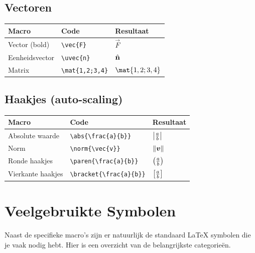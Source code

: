 \documentclass[a4paper,11pt]{article}
\begin{document}
\subsection{Vectoren}

\begin{tabular}{lll}
\toprule
\textbf{Macro} & \textbf{Code} & \textbf{Resultaat} \\
\midrule
Vector (bold) & \verb|\vec{F}| & $\vec{F}$ \\
Eenheidsvector & \verb|\uvec{n}| & $\hat{\mathbf{n}}$ \\
Matrix & \verb|\mat{1,2;3,4}| & $\mat{1,2;3,4}$ \\
\bottomrule
\end{tabular}

\subsection{Haakjes (auto-scaling)}

\begin{tabular}{lll}
\toprule
\textbf{Macro} & \textbf{Code} & \textbf{Resultaat} \\
\midrule
Absolute waarde & \verb|\abs{\frac{a}{b}}| & $\left|\frac{a}{b}\right|$ \\
Norm & \verb|\norm{\vec{v}}| & $\left\|\boldsymbol{v}\right\|$ \\
Ronde haakjes & \verb|\paren{\frac{a}{b}}| & $\left(\frac{a}{b}\right)$ \\
Vierkante haakjes & \verb|\bracket{\frac{a}{b}}| & $\left[\frac{a}{b}\right]$ \\
\bottomrule
\end{tabular}

\section{Veelgebruikte Symbolen}
\label{sec:std_symbols}

Naast de specifieke macro's zijn er natuurlijk de standaard LaTeX symbolen die je vaak nodig hebt. Hier is een overzicht van de belangrijkste categorieën.
\end{document}
